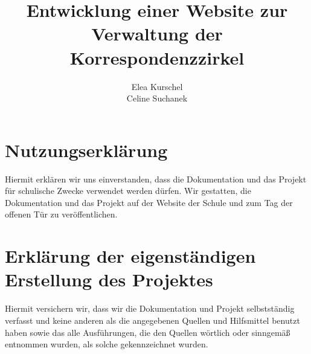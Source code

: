 \documentclass[11pt, oneside, halfparskip, smallheadings, automark]{scrreprt}
\title{Entwicklung einer Website zur Verwaltung der Korrespondenzzirkel}
\author{Elea Kurschel \\ Celine Suchanek}
\begin{document}
\maketitle

\tableofcontents










\listoffigures
\listoftables

\chapter*{Nutzungserklärung}
Hiermit erklären wir uns einverstanden, dass die Dokumentation und das Projekt für
schulische Zwecke verwendet werden dürfen.
Wir gestatten, die Dokumentation und das Projekt auf der Website der Schule und zum
Tag der offenen Tür zu veröffentlichen.

\chapter*{Erklärung der eigenständigen Erstellung des Projektes}
Hiermit versichern wir, dass wir die Dokumentation und Projekt selbstständig verfasst und
keine anderen als die angegebenen Quellen und Hilfsmittel benutzt haben sowie das alle
Ausführungen, die den Quellen wörtlich oder sinngemäß entnommen wurden, als solche
gekennzeichnet wurden.
\end{document}
